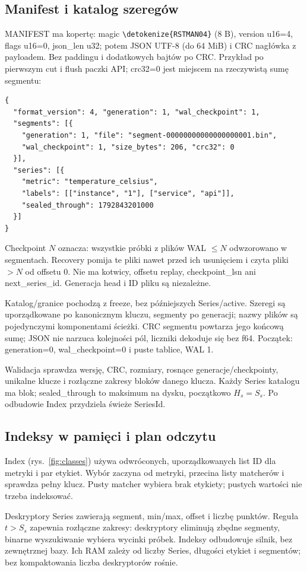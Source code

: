 \documentclass[11pt,a4paper]{article}
\newcommand{\code}[1]{\expandafter\nolinkurl\expandafter{\detokenize{#1}}}
\begin{document}
\subsection{Manifest i katalog szeregów}
\label{sec:manifest}
MANIFEST ma kopertę: magic \code{RSTMAN04} (8 B), version u16=4,
flags u16=0, json\_len u32; potem JSON UTF-8 (do 64 MiB) i CRC nagłówka
z payloadem. Bez paddingu i dodatkowych bajtów po CRC.
Przykład po pierwszym cut i flush paczki API; crc32=0 jest miejscem
na rzeczywistą sumę segmentu:
\begin{lstlisting}
{
  "format_version": 4, "generation": 1, "wal_checkpoint": 1,
  "segments": [{
    "generation": 1, "file": "segment-00000000000000000001.bin",
    "wal_checkpoint": 1, "size_bytes": 206, "crc32": 0
  }],
  "series": [{
    "metric": "temperature_celsius",
    "labels": [["instance", "1"], ["service", "api"]],
    "sealed_through": 1792843201000
  }]
}
\end{lstlisting}
Checkpoint $N$ oznacza: wszystkie próbki z plików WAL $\leq N$
odwzorowano w segmentach. Recovery pomija te pliki nawet przed ich
usunięciem i czyta pliki $>N$ od offsetu 0.
Nie ma kotwicy, offsetu replay, checkpoint\_lsn ani next\_series\_id.
Generacja head i ID pliku są niezależne.

Katalog/granice pochodzą z freeze, bez późniejszych Series/active.
Szeregi są uporządkowane po kanonicznym kluczu, segmenty po generacji;
nazwy plików są pojedynczymi komponentami ścieżki.
CRC segmentu powtarza jego końcową sumę; JSON nie narzuca kolejności
pól, liczniki dekoduje się bez f64.
Początek: generation=0, wal\_checkpoint=0 i puste tablice, WAL 1.

Walidacja sprawdza wersję, CRC, rozmiary, rosnące generacje/checkpointy,
unikalne klucze i rozłączne zakresy bloków danego klucza.
Każdy Series katalogu ma blok; sealed\_through to maksimum na dysku,
początkowo $H_s=S_s$. Po odbudowie Index przydziela świeże SeriesId.

\subsection{Indeksy w pamięci i plan odczytu}
Index (rys.~\ref{fig:classes}) używa odwróconych, uporządkowanych list ID
dla metryki i par etykiet. Wybór zaczyna od metryki, przecina listy
matcherów i sprawdza pełny klucz. Pusty matcher wybiera brak etykiety;
pustych wartości nie trzeba indeksować.

Deskryptory Series zawierają segment, min/max, offset i liczbę punktów.
Reguła $t>S_s$ zapewnia rozłączne zakresy: deskryptory eliminują zbędne
segmenty, binarne wyszukiwanie wybiera wycinki próbek.
Indeksy odbudowuje silnik, bez zewnętrznej bazy. Ich RAM zależy
od liczby Series, długości etykiet i segmentów; bez kompaktowania
liczba deskryptorów rośnie.
\end{document}
